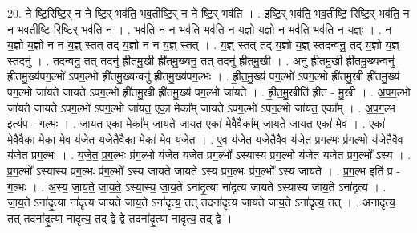 \documentclass[17pt]{extarticle}
\begin{document}
20. ने ष्टि॒रिष्टि॒र् न ने ष्टि॒र् भव॑ति॒ भव॒तीष्टि॒र् न ने ष्टि॒र् भव॑ति । . इष्टि॒र् भव॑ति॒ भव॒तीष्टि॒ रिष्टि॒र् भव॑ति॒ न न भव॒तीष्टि॒ रिष्टि॒र् भव॑ति॒ न । . भव॑ति॒ न न भव॑ति॒ भव॑ति॒ न य॒ज्ञो य॒ज्ञो न भव॑ति॒ भव॑ति॒ न य॒ज्ञ्ः । . न य॒ज्ञो य॒ज्ञो न न य॒ज्ञ् स्तत् तद् य॒ज्ञो न न य॒ज्ञ् स्तत् । . य॒ज्ञ् स्तत् तद् य॒ज्ञो य॒ज्ञ् स्तदन्वनु॒ तद् य॒ज्ञो य॒ज्ञ् स्तदनु॑ । . तदन्वनु॒ तत् तदनु॑ ह्रीतमु॒खी ह्री॑तमु॒ख्यनु॒ तत् तदनु॑ ह्रीतमु॒खी । . अनु॑ ह्रीतमु॒खी ह्री॑तमु॒ख्यन्वनु॑ ह्रीतमु॒ख्य॑पग॒ल्भो॑ ऽपग॒ल्भो ह्री॑तमु॒ख्यन्वनु॑ ह्रीतमु॒ख्य॑पग॒ल्भः । . ह्री॒त॒मु॒ख्य॑ पग॒ल्भो॑ ऽपग॒ल्भो ह्री॑तमु॒खी ह्री॑तमु॒ख्य॑ पग॒ल्भो जा॑यते जायते ऽपग॒ल्भो ह्री॑तमु॒खी ह्री॑तमु॒ख्य॑ पग॒ल्भो जा॑यते । . ह्री॒त॒मु॒खीति॑ ह्रीत - मु॒खी । . अ॒प॒ग॒ल्भो जा॑यते जायते ऽपग॒ल्भो॑ ऽपग॒ल्भो जा॑यत॒ एका॒ मेका᳚म् जायते ऽपग॒ल्भो॑ ऽपग॒ल्भो जा॑यत॒ एका᳚म् । . अ॒प॒ग॒ल्भ इत्य॑प - ग॒ल्भः । . जा॒य॒त॒ एका॒ मेका᳚म् जायते जायत॒ एका॑ मे॒वैवैका᳚म् जायते जायत॒ एका॑ मे॒व । . एका॑ मे॒वैवैका॒ मेका॑ मे॒व य॑जेत यजेतै॒वैका॒ मेका॑ मे॒व य॑जेत । . ए॒व य॑जेत यजेतै॒वैव य॑जेत प्रग॒ल्भः प्र॑ग॒ल्भो य॑जेतै॒वैव य॑जेत प्रग॒ल्भः । . य॒जे॒त॒ प्र॒ग॒ल्भः प्र॑ग॒ल्भो य॑जेत यजेत प्रग॒ल्भो᳚ ऽस्यास्य प्रग॒ल्भो य॑जेत यजेत प्रग॒ल्भो᳚ ऽस्य । . प्र॒ग॒ल्भो᳚ ऽस्यास्य प्रग॒ल्भः प्र॑ग॒ल्भो᳚ ऽस्य जायते जायते ऽस्य प्रग॒ल्भः प्र॑ग॒ल्भो᳚ ऽस्य जायते । . प्र॒ग॒ल्भ इति॑ प्र - ग॒ल्भः । . अ॒स्य॒ जा॒य॒ते॒ जा॒य॒ते॒ ऽस्या॒स्य॒ जा॒य॒ते ऽना॑दृ॒त्या ना॑दृत्य जायते ऽस्यास्य जाय॒ते ऽना॑दृत्य । . जा॒य॒ते ऽना॑दृ॒त्या ना॑दृत्य जायते जाय॒ते ऽना॑दृत्य॒ तत् तदना॑दृत्य जायते जाय॒ते ऽना॑दृत्य॒ तत् । . अना॑दृत्य॒ तत् तदना॑दृ॒त्या ना॑दृत्य॒ तद् द्वे द्वे तदना॑दृ॒त्या ना॑दृत्य॒ तद् द्वे । \newline
\end{document}
